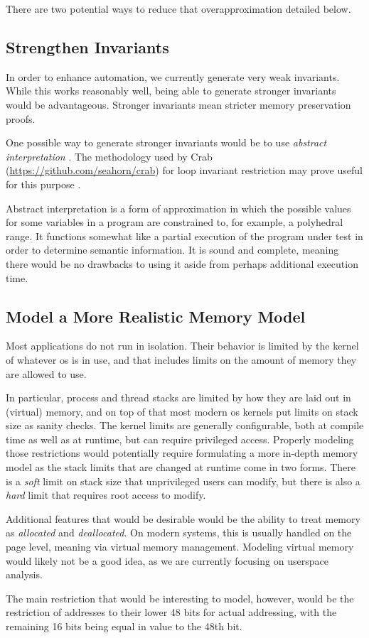There are two potential ways to reduce that overapproximation detailed below.

\subsection{Strengthen Invariants}
In order to enhance automation, we currently generate very weak invariants.
While this works reasonably well, being able to generate stronger invariants
would be advantageous. Stronger invariants mean stricter memory preservation proofs.

One possible way to generate stronger invariants would be to use
\emph{abstract interpretation}
\autocite{cousot1976static,cousot1977aiu}.
The methodology used by Crab (\url{https://github.com/seahorn/crab})
for loop invariant restriction may prove useful for this purpose
\autocite{gange2016abstract}.

Abstract interpretation is a form of approximation
in which the possible values for some variables in a program
are constrained to, for example, a polyhedral range.
It functions somewhat like a partial execution of the program under test
in order to determine semantic information.
It is sound and complete, meaning there would be no drawbacks to using it
aside from perhaps additional execution time.

\subsection{Model a More Realistic Memory Model}
Most applications do not run in isolation. Their behavior is limited by
the kernel of whatever \ac{os} is in use,
and that includes limits on the amount of memory they are allowed to use.

In particular, process and thread stacks are limited
by how they are laid out in (virtual) memory, and on top of that
most modern \ac{os} kernels put limits on stack size as sanity checks.
The kernel limits are generally configurable,
both at compile time as well as at runtime, but can require privileged access.
Properly modeling those restrictions
would potentially require formulating a more in-depth memory model
as the stack limits that are changed at runtime come in two forms.
There is a \emph{soft} limit on stack size that unprivileged users
can modify, but there is also a \emph{hard} limit
that requires root access to modify.

Additional features that would be desirable
would be the ability to treat memory as \emph{allocated} and \emph{deallocated}.
On modern systems, this is usually handled on the page level,
meaning via virtual memory management.
Modeling virtual memory would likely not be a good idea,
as we are currently focusing on userspace analysis.

The main restriction that would be interesting to model, however,
would be the restriction of addresses to their lower 48 bits for actual addressing,
with the remaining 16 bits being equal in value to the 48th bit.
